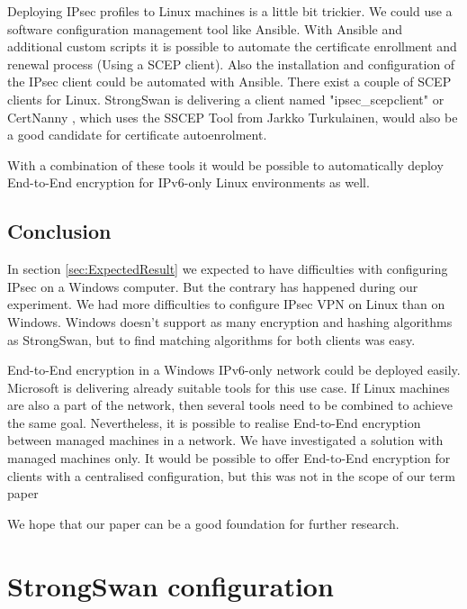 \documentclass[a4paper]{report}
\begin{document}
Deploying IPsec profiles to Linux machines is a little bit trickier. We could use a software configuration management tool like Ansible. 
With Ansible and additional custom scripts it is possible to automate the certificate enrollment and renewal process (Using a SCEP client).
Also the installation and configuration of the IPsec client could be automated with Ansible. 
There exist a couple of SCEP clients for Linux. StrongSwan is delivering a client named "ipsec\_scepclient" \parencite{Hutter2005} or CertNanny \parencite{Bartosch2017}, 
which uses the SSCEP Tool from Jarkko Turkulainen, would also be a good candidate for certificate autoenrolment.

With a combination of these tools it would be possible to automatically deploy End-to-End encryption for IPv6-only Linux environments as well.

\section{Conclusion}
\label{sec:Conc}
In section \ref{sec:ExpectedResult} we expected to have difficulties with configuring IPsec on a Windows computer. But the contrary has happened during our experiment. 
We had more difficulties to configure IPsec VPN on Linux than on Windows. Windows doesn't support as many encryption and hashing algorithms as StrongSwan, but to find matching algorithms for both clients was easy.

End-to-End encryption in a Windows IPv6-only network could be deployed easily. Microsoft is delivering already suitable tools for this use case. 
If Linux machines are also a part of the network, then several tools need to be combined to achieve the same goal. Nevertheless, it is possible to realise End-to-End encryption between managed machines in a network. 
We have investigated a solution with managed machines only. It would be possible to offer End-to-End encryption for clients with a centralised configuration, but this was not in the scope of our term paper

We hope that our paper can be a good foundation for further research. 

\appendix

\chapter{StrongSwan configuration}
\label{app-ch:StrongSwan}
\end{document}
